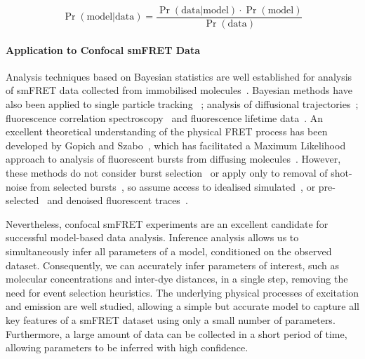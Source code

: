\begin{equation}
\Pr(\text{model}|\text{data}) = \frac{\Pr(\text{data}|\text{model}) \cdot \Pr(\text{model})}{\Pr(\text{data})} 
\label{eq:model_probability}
\end{equation}

\paragraph{Application to Confocal smFRET Data}
Analysis techniques based on Bayesian statistics are well established for analysis of smFRET data collected from immobilised molecules~\cite{mckinney06, bronson09, bronson10, taylor10, taylor11, uphoff2011}. Bayesian methods have also been applied to single particle tracking ~\cite{yoon08}; analysis of diffusional trajectories~\cite{turkcan12, stigler2012}; fluorescence correlation spectroscopy~\cite{kugel12, guo11, he11, guo2014} and fluorescence lifetime data~\cite{kou05, kalinin2008}. An excellent theoretical understanding of the physical FRET process has been developed by Gopich and Szabo~\cite{gopich07, gopich09, gopich12}, which has facilitated a Maximum Likelihood approach to analysis of fluorescent bursts from diffusing molecules~\cite{gopich12, devore12}.  However, these methods do not consider burst selection~\cite{gopich12} or apply only to removal of shot-noise from selected bursts~\cite{gopich07}, so assume access to idealised simulated~\cite{gopich07}, or pre-selected~\cite{devore12, gopich12} and denoised fluorescent traces~\cite{kou05}.

Nevertheless, confocal smFRET experiments are an excellent candidate for successful model-based data analysis. Inference analysis allows us to simultaneously infer all parameters of a model, conditioned on the observed dataset. Consequently, we can accurately infer parameters of interest, such as molecular concentrations and inter-dye distances, in a single step, removing the need for event selection heuristics. The underlying physical processes of excitation and emission are well studied, allowing a simple but accurate model to capture all key features of a smFRET dataset using only a small number of parameters. Furthermore, a large amount of data can be collected in a short period of time, allowing parameters to be inferred with high confidence.

